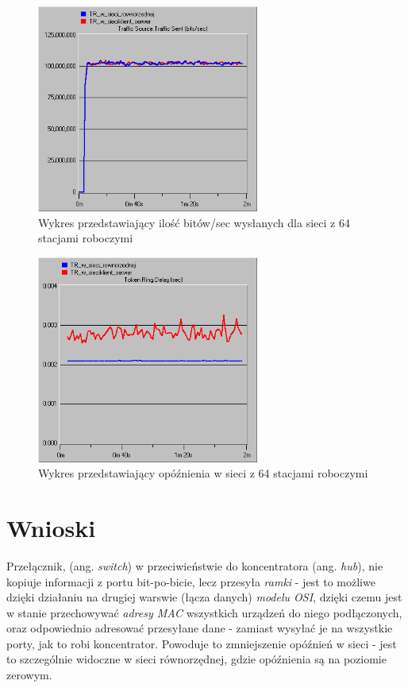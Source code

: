 \documentclass{article}
\begin{document}
\begin{figure}[H]
  \centering
  \includegraphics[width=0.65\textwidth]{screens/64_recv.png}
 \caption{Wykres przedstawiający ilość bitów/sec wysłanych dla sieci z 64 stacjami roboczymi}
 \label{fig:64r}
\end{figure}

\begin{figure}[H]
  \centering
  \includegraphics[width=0.65\textwidth]{screens/64_delay.png}
 \caption{Wykres przedstawiający opóźnienia w sieci z 64 stacjami roboczymi}
 \label{fig:64d}
\end{figure}



\section{Wnioski}
Przełącznik, (ang. \textit{switch}) w przeciwieństwie do koncentratora (ang. \textit{hub}), nie kopiuje informacji z portu bit-po-bicie, lecz przesyła \emph{ramki} - jest to możliwe dzięki działaniu na drugiej warswie (łącza danych) \emph{modelu OSI}, dzięki czemu jest w stanie przechowywać \emph{adresy MAC} wszystkich urządzeń do niego podłączonych, oraz odpowiednio adresować przesyłane dane - zamiast wysyłać je na wszystkie porty, jak to robi koncentrator. Powoduje to zmniejszenie opóźnień w sieci - jest to szczególnie widoczne w sieci równorzędnej, gdzie opóźnienia są na poziomie zerowym.
\end{document}

